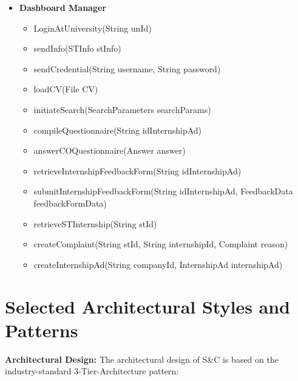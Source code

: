 \begin{itemize}
      \item \textbf{Dashboard Manager}
            \begin{itemize}
                  \item LoginAtUniversity(String unId)
                  \item sendInfo(STInfo stInfo)
                  \item sendCredential(String username, String password)
                  \item loadCV(File CV)
                  \item initiateSearch(SearchParameters searchParams)
                  \item compileQuestionnaire(String idInternshipAd)
                  \item answerCOQuestionnaire(Answer answer)
                  \item retrieveInternshipFeedbackForm(String idInternshipAd)
                  \item submitInternshipFeedbackForm(String idInternshipAd, FeedbackData feedbackFormData)
                  \item retrieveSTInternship(String stId)
                  \item createComplaint(String stId, String internshipId, Complaint reason)
                  \item createInternshipAd(String companyId, InternshipAd internshipAd)
            \end{itemize}

\end{itemize}

\section{Selected Architectural Styles and Patterns}
\label{sec:selected-architectural-styles-patterns}%

\par{\textbf{Architectural Design:}} The architectural design of S\&C is based on the industry-standard 3-Tier-Architecture pattern:

